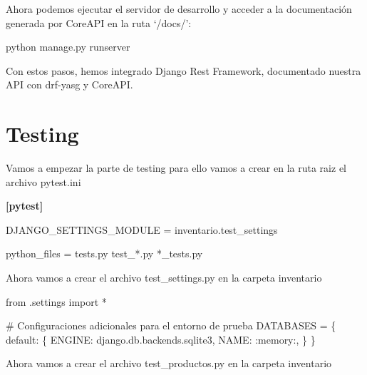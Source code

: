 \documentclass[
  a4paper,
  DIV=11,
  numbers=noendperiod,
  onepage,
  openany]{scrreprt}
\newenvironment{Shaded}{\begin{snugshade}}{\end{snugshade}}
\newcommand{\CommentTok}[1]{\textcolor[rgb]{0.37,0.37,0.37}{#1}}
\newcommand{\DataTypeTok}[1]{\textcolor[rgb]{0.68,0.00,0.00}{#1}}
\newcommand{\ExtensionTok}[1]{\textcolor[rgb]{0.00,0.23,0.31}{#1}}
\newcommand{\ImportTok}[1]{\textcolor[rgb]{0.00,0.46,0.62}{#1}}
\newcommand{\KeywordTok}[1]{\textcolor[rgb]{0.00,0.23,0.31}{\textbf{#1}}}
\newcommand{\NormalTok}[1]{\textcolor[rgb]{0.00,0.23,0.31}{#1}}
\newcommand{\OperatorTok}[1]{\textcolor[rgb]{0.37,0.37,0.37}{#1}}
\newcommand{\OtherTok}[1]{\textcolor[rgb]{0.00,0.23,0.31}{#1}}
\newcommand{\StringTok}[1]{\textcolor[rgb]{0.13,0.47,0.30}{#1}}
\begin{document}
\begin{tcolorbox}
Ahora podemos ejecutar el servidor de desarrollo y acceder a la
documentación generada por CoreAPI en la ruta `/docs/':

\begin{Shaded}
\begin{Highlighting}[]
\ExtensionTok{python}\NormalTok{ manage.py runserver}
\end{Highlighting}
\end{Shaded}

Con estos pasos, hemos integrado Django Rest Framework, documentado
nuestra API con drf-yasg y CoreAPI.

\chapter{Testing}\label{testing-1}

Vamos a empezar la parte de testing para ello vamos a crear en la ruta
raiz el archivo pytest.ini

\begin{Shaded}
\begin{Highlighting}[]
\KeywordTok{[pytest]}

\DataTypeTok{DJANGO\_SETTINGS\_MODULE }\OtherTok{=}\StringTok{ inventario.test\_settings}

\DataTypeTok{python\_files }\OtherTok{=}\StringTok{ tests.py test\_*.py *\_tests.py}
\end{Highlighting}
\end{Shaded}

Ahora vamos a crear el archivo test\_settings.py en la carpeta
inventario

\begin{Shaded}
\begin{Highlighting}[]
\ImportTok{from}\NormalTok{ .settings }\ImportTok{import} \OperatorTok{*}

\CommentTok{\# Configuraciones adicionales para el entorno de prueba}
\NormalTok{DATABASES }\OperatorTok{=}\NormalTok{ \{}
    \StringTok{\textquotesingle{}default\textquotesingle{}}\NormalTok{: \{}
        \StringTok{\textquotesingle{}ENGINE\textquotesingle{}}\NormalTok{: }\StringTok{\textquotesingle{}django.db.backends.sqlite3\textquotesingle{}}\NormalTok{,}
        \StringTok{\textquotesingle{}NAME\textquotesingle{}}\NormalTok{: }\StringTok{\textquotesingle{}:memory:\textquotesingle{}}\NormalTok{,}
\NormalTok{    \}}
\NormalTok{\}}
\end{Highlighting}
\end{Shaded}

Ahora vamos a crear el archivo test\_productos.py en la carpeta
inventario


\end{tcolorbox}
\end{document}
